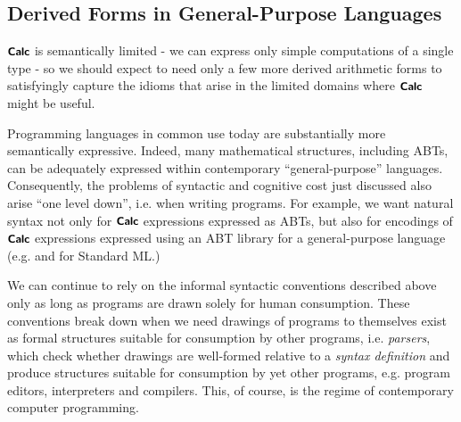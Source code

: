 \subsection{Derived Forms in General-Purpose Languages}
$\textsf{\textbf{\small Calc}}$ is semantically limited - we can express only simple computations of a single type - so we should expect to need only a few more derived arithmetic forms to satisfyingly capture the  idioms that arise in the limited domains where $\textsf{\textbf{\small Calc}}$ might be useful. %

Programming languages in common use today are substantially more semantically expressive. Indeed, many mathematical structures, including ABTs, can be adequately expressed within contemporary ``general-purpose'' languages. %
Consequently, the problems of syntactic and cognitive cost just discussed also arise ``one level down'', i.e. when writing programs. For example, we want natural syntax not only for $\textsf{\textbf{\small Calc}}$ expressions expressed as ABTs, but also for encodings of $\textsf{\textbf{\small Calc}}$ expressions expressed using an ABT library for a general-purpose language (e.g. \cite{SML-single-sorted-abts} and \cite{SML-typed-abts} for Standard ML.)%

We can continue to rely on the informal syntactic conventions described above only as long as programs are drawn solely for human consumption. These conventions break down when we need drawings of programs to themselves exist as formal structures suitable for consumption by other programs, i.e. \emph{parsers}, which check whether drawings are well-formed relative to a \emph{syntax definition} and produce structures suitable for consumption by yet other programs, e.g. program editors, interpreters and compilers. This, of course, is the regime of contemporary computer programming.




